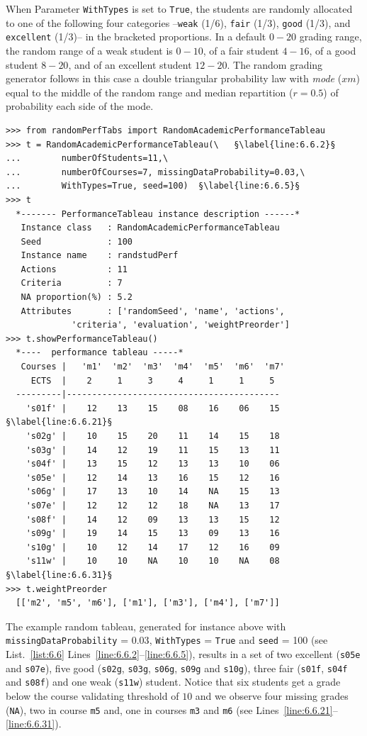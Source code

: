 When Parameter \texttt{WithTypes} is set to \texttt{True}, the students are randomly allocated to one of the following four categories --\texttt{weak} (1/6), \texttt{fair} (1/3), \texttt{good} (1/3), and \texttt{excellent} (1/3)-- in the bracketed proportions. In a default $0-20$ grading range, the random range of a weak student is $0-10$, of a fair student $4-16$, of a good student $8-20$, and of an excellent student $12-20$. The random grading generator follows in this case a double triangular probability law with \emph{mode} ($xm$) equal to the middle of the random range and median repartition ($r = 0.5$) of probability each side of the mode.
\begin{lstlisting}[caption={Generating a random academic performance tableau},label=list:6.6]
>>> from randomPerfTabs import RandomAcademicPerformanceTableau
>>> t = RandomAcademicPerformanceTableau(\   §\label{line:6.6.2}§
...        numberOfStudents=11,\
...        numberOfCourses=7, missingDataProbability=0.03,\
...        WithTypes=True, seed=100)  §\label{line:6.6.5}§
>>> t
  *------- PerformanceTableau instance description ------*
   Instance class   : RandomAcademicPerformanceTableau
   Seed             : 100
   Instance name    : randstudPerf
   Actions          : 11
   Criteria         : 7
   NA proportion(%) : 5.2
   Attributes       : ['randomSeed', 'name', 'actions',
             'criteria', 'evaluation', 'weightPreorder']
>>> t.showPerformanceTableau()
  *----  performance tableau -----*
   Courses |   'm1'  'm2'  'm3'  'm4'  'm5'  'm6'  'm7' 
     ECTS  |    2     1     3     4     1     1     5    
  ---------|------------------------------------------
    's01f' |    12    13    15    08    16    06    15   §\label{line:6.6.21}§
    's02g' |    10    15    20    11    14    15    18   
    's03g' |    14    12    19    11    15    13    11   
    's04f' |    13    15    12    13    13    10    06   
    's05e' |    12    14    13    16    15    12    16   
    's06g' |    17    13    10    14    NA    15    13   
    's07e' |    12    12    12    18    NA    13    17   
    's08f' |    14    12    09    13    13    15    12   
    's09g' |    19    14    15    13    09    13    16   
    's10g' |    10    12    14    17    12    16    09   
    's11w' |    10    10    NA    10    10    NA    08   §\label{line:6.6.31}§
>>> t.weightPreorder
  [['m2', 'm5', 'm6'], ['m1'], ['m3'], ['m4'], ['m7']]
\end{lstlisting}
  
The example random tableau, generated for instance above with \texttt{missingData\-Proba\-bility} = $0.03$, \texttt{WithTypes} = \texttt{True} and \texttt{seed} = 100 (see List.~\vref{list:6.6} Lines~\ref{line:6.6.2}--\ref{line:6.6.5}), results in a set of two excellent (\texttt{s05e} and \texttt{s07e}), five good (\texttt{s02g}, \texttt{s03g}, \texttt{s06g}, \texttt{s09g} and \texttt{s10g}), three fair (\texttt{s01f}, \texttt{s04f} and \texttt{s08f}) and one weak (\texttt{s11w}) student. Notice that six students get a grade below the course validating threshold of $10$ and we observe four missing grades (\texttt{NA}), two in course \texttt{m5} and, one in courses \texttt{m3} and \texttt{m6} (see Lines~\ref{line:6.6.21}--\ref{line:6.6.31}).

